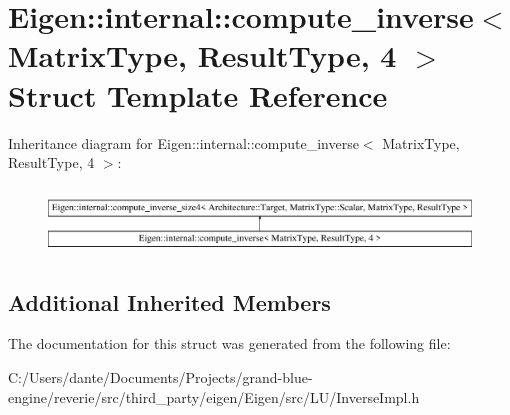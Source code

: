 \hypertarget{struct_eigen_1_1internal_1_1compute__inverse_3_01_matrix_type_00_01_result_type_00_014_01_4}{}\section{Eigen\+::internal\+::compute\+\_\+inverse$<$ Matrix\+Type, Result\+Type, 4 $>$ Struct Template Reference}
\label{struct_eigen_1_1internal_1_1compute__inverse_3_01_matrix_type_00_01_result_type_00_014_01_4}
Inheritance diagram for Eigen\+::internal\+::compute\+\_\+inverse$<$ Matrix\+Type, Result\+Type, 4 $>$\+:\begin{figure}[H]
\begin{center}
\leavevmode
\includegraphics[height=1.772152cm]{struct_eigen_1_1internal_1_1compute__inverse_3_01_matrix_type_00_01_result_type_00_014_01_4}
\end{center}
\end{figure}
\subsection*{Additional Inherited Members}


The documentation for this struct was generated from the following file\+:\begin{DoxyCompactItemize}
\item 
C\+:/\+Users/dante/\+Documents/\+Projects/grand-\/blue-\/engine/reverie/src/third\+\_\+party/eigen/\+Eigen/src/\+L\+U/Inverse\+Impl.\+h\end{DoxyCompactItemize}
